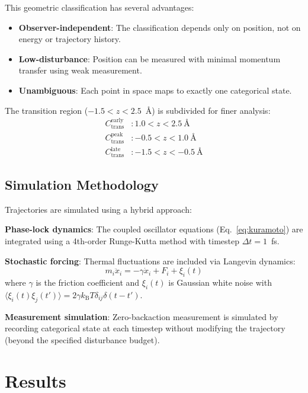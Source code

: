 \documentclass[twocolumn,amsmath,amssymb,aps,prb,superscriptaddress,longbibliography]{revtex4-2}
\newcommand{\kB}{k_{\mathrm{B}}}
\begin{document}
This geometric classification has several advantages:
\begin{itemize}
\item \textbf{Observer-independent}: The classification depends only on position, not on energy or trajectory history.
\item \textbf{Low-disturbance}: Position can be measured with minimal momentum transfer using weak measurement.
\item \textbf{Unambiguous}: Each point in space maps to exactly one categorical state.
\end{itemize}

The transition region ($-1.5 < z < 2.5$~\AA) is subdivided for finer analysis:
\begin{align}
C_{\text{trans}}^{\text{early}} &: 1.0 < z < 2.5~\text{\AA} \\
C_{\text{trans}}^{\text{peak}} &: -0.5 < z < 1.0~\text{\AA} \\
C_{\text{trans}}^{\text{late}} &: -1.5 < z < -0.5~\text{\AA}
\end{align}

\subsection{Simulation Methodology}

Trajectories are simulated using a hybrid approach:

\textbf{Phase-lock dynamics}: The coupled oscillator equations (Eq.~\ref{eq:kuramoto}) are integrated using a 4th-order Runge-Kutta method with timestep $\Delta t = 1$~fs.

\textbf{Stochastic forcing}: Thermal fluctuations are included via Langevin dynamics:
\begin{equation}
m_i \ddot{x}_i = -\gamma \dot{x}_i + F_i + \xi_i(t)
\end{equation}
where $\gamma$ is the friction coefficient and $\xi_i(t)$ is Gaussian white noise with $\langle \xi_i(t) \xi_j(t') \rangle = 2\gamma \kB T \delta_{ij} \delta(t-t')$.

\textbf{Measurement simulation}: Zero-backaction measurement is simulated by recording categorical state at each timestep without modifying the trajectory (beyond the specified disturbance budget).

\section{Results}
\label{sec:results}
\end{document}
